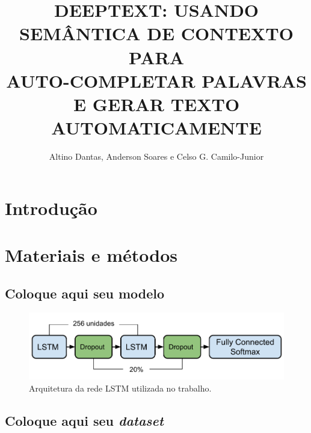 \documentclass[isoft]{ufgtexposter}
\title{\uppercase{DeepText: usando semântica de contexto para\\
auto-completar palavras e gerar texto automaticamente}}
\author{Altino Dantas, Anderson Soares e Celso G. Camilo-Junior}
\begin{document}
    \begin{poster}
    
    \section{Introdução}
    
        \lipsum[3]
        
    \section{Materiais e métodos}%
        
        \subsection{Coloque aqui seu modelo}
        
        \lipsum[11]
        
        \vspace{1cm}
        
        \begin{figure}
            \centering
            \captionsetup{type=figure}
            \includegraphics[scale=2.3]{modelo-lstm}
            \caption{Arquitetura da rede LSTM utilizada no trabalho.}
            \label{fig:lstm}
        \end{figure}
        
        \subsection{Coloque aqui seu \textit{dataset}}
        
            \lipsum[54]
            

\end{poster}
\end{document}
